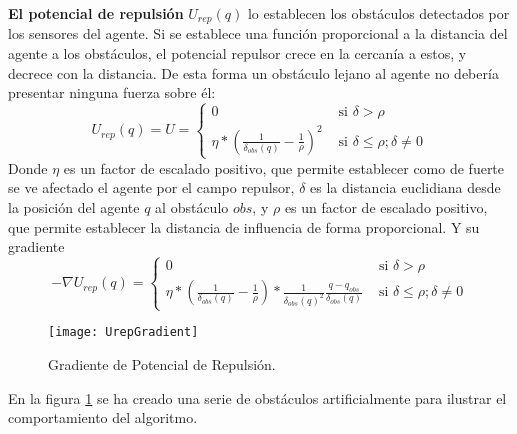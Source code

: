 \textbf{El potencial de repulsión} $U_{rep}(q)$ lo establecen los obstáculos detectados por los sensores del agente. Si se establece una función proporcional a la distancia del agente a los obstáculos, el potencial repulsor crece en la cercanía a estos, y decrece con la distancia. De esta forma un obstáculo lejano al agente no debería presentar ninguna fuerza sobre él:
\begin{equation}
U_{rep}(q) = U = \begin{cases}
0 & \text{ si } \delta > \rho \\ 
\eta * (\frac{1}{\delta_{obs}(q)}-\frac{1}{\rho})^2 & \text{ si } \delta \leq \rho; \delta \neq 0 
\end{cases}
\label{equation:Urepq}
\end{equation}
Donde $\eta$ es un factor de escalado positivo, que permite establecer como de fuerte se ve afectado el agente por el campo repulsor, $\delta$ es la distancia euclidiana desde la posición del agente $q$ al obstáculo $obs$, y $\rho$ es un factor de escalado positivo, que permite establecer la distancia de influencia de forma proporcional. Y su gradiente
\begin{equation}
-\nabla U_{rep}(q) = \begin{cases} 0 & \text{ si } \delta > \rho \\
\eta * (\frac{1}{\delta_{obs}(q)}-\frac{1}{\rho}) * \frac{1}{\delta_{obs}(q)^2}\frac{q-q_{obs}}{\delta_{obs}(q)} & \text{ si }  \delta \leq \rho; \delta \neq 0  
\end{cases}
\label{equation:dUrepq}
\end{equation}
\begin{figure}[H]
	\centering
	\texttt{[image: UrepGradient]}
	\caption{Gradiente de Potencial de Repulsión.}\label{fig:urepgrad}
\end{figure}

 En la figura \ref{fig:urepgrad} se ha creado una serie de obstáculos artificialmente para ilustrar el comportamiento del algoritmo. 

 \newpage
